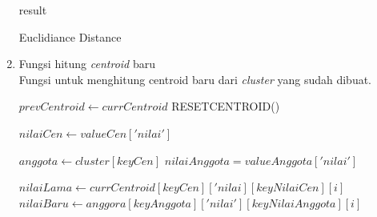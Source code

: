 \begin{enumerate}
\begin{algorithm}[H]
\begin{algorithmic}[1]
                    \State \Return result
                \EndProcedure
            \end{algorithmic} 
            \caption{Euclidiance Distance}
            \label{alg:euclidianceDistance}
        \end{algorithm}
    
    \item Fungsi hitung \textit{centroid} baru \\
        Fungsi untuk menghitung centroid baru dari \textit{cluster} yang sudah dibuat. \\
        
        \begin{algorithm}[H]
            \begin{algorithmic}[1]
                    \State $prevCentroid \gets currCentroid$
                    \State RESETCENTROID()
                    
                        \State $nilaiCen \gets valueCen['nilai']$
                        
                            \State $anggota \gets cluster[keyCen]$
                                    \State $nilaiAnggota = valueAnggota['nilai']$
                                    
                                                \State $nilaiLama \gets currCentroid[keyCen]['nilai][keyNilaiCen][i]$
                                                \State $nilaiBaru \gets anggora[keyAnggota]['nilai'][keyNilaiAnggota][i]$
                                                

\end{algorithmic}
\end{algorithm}
\end{enumerate}
